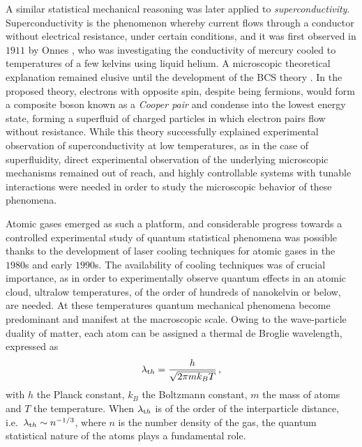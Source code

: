 A similar statistical mechanical reasoning was later applied to \textit{superconductivity}. Superconductivity is the phenomenon whereby current flows through a conductor without electrical resistance, under certain conditions, and it was first observed in $1911$ by Onnes \cite{Onnes1912few}, who was investigating the conductivity of mercury cooled to temperatures of a few kelvins using liquid helium. A microscopic theoretical explanation remained elusive until the development of the \ac{BCS} theory \cite{Bardeen1957tos}. In the proposed theory, electrons with opposite spin, despite being fermions, would form a composite boson known as a \textit{Cooper pair} and condense into the lowest energy state, forming a superfluid of charged particles in which electron pairs flow without resistance. While this theory successfully explained experimental observation of superconductivity at low temperatures, as in the case of superfluidity, direct experimental observation of the underlying microscopic mechanisms remained out of reach, and highly controllable systems with tunable interactions were needed in order to study the microscopic behavior of these phenomena. 

Atomic gases emerged as such a platform, and considerable progress towards a controlled experimental study of quantum statistical phenomena was possible thanks to the development of laser cooling techniques for atomic gases in the $1980$s and early $1990$s. The availability of cooling techniques was of crucial importance, as in order to  experimentally observe quantum effects in an atomic cloud, ultralow temperatures, of the order of hundreds of nanokelvin or below, are needed. At these temperatures quantum mechanical phenomena become predominant and manifest at the macroscopic scale. Owing to the wave-particle duality of matter, each atom can be assigned a thermal de Broglie wavelength, expressed as
\begin{equation}
	\lambda_{\textrm th}=\frac{h}{\sqrt{2\pi mk_BT}}\,,
\end{equation}
with $h$ the Planck constant, $k_B$ the Boltzmann constant, $m$ the mass of atoms and $T$ the temperature. When $\lambda_{\textrm th}$ is of the order of the interparticle distance, i.e.~$\lambda_{\textrm th}\sim n^{-1/3}$, where 
$n$ is the number density of the gas, the quantum statistical nature of the atoms plays a fundamental role.


